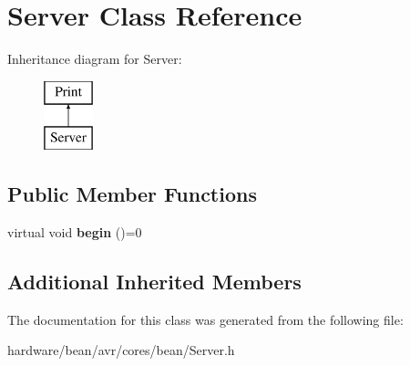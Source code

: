 \hypertarget{class_server}{}\section{Server Class Reference}
\label{class_server}
Inheritance diagram for Server\+:\begin{figure}[H]
\begin{center}
\leavevmode
\includegraphics[height=2.000000cm]{class_server}
\end{center}
\end{figure}
\subsection*{Public Member Functions}
\begin{DoxyCompactItemize}
\item 
\hypertarget{class_server_a6a22743b64cf89b4fc092ec4515e4b7c}{}virtual void {\bfseries begin} ()=0\label{class_server_a6a22743b64cf89b4fc092ec4515e4b7c}

\end{DoxyCompactItemize}
\subsection*{Additional Inherited Members}


The documentation for this class was generated from the following file\+:\begin{DoxyCompactItemize}
\item 
hardware/bean/avr/cores/bean/Server.\+h\end{DoxyCompactItemize}
